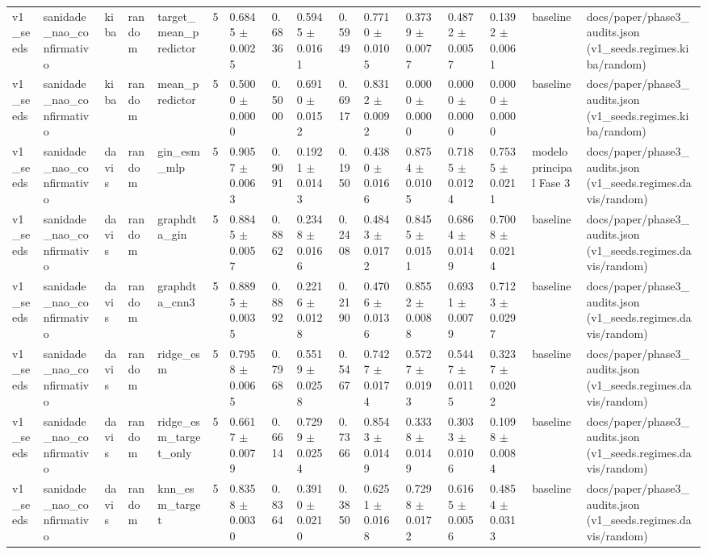 \begin{table}[htbp]
\begin{tabular}{llllllllllllllll}
v1\_seeds & sanidade\_nao\_confirmativo & kiba & random & target\_mean\_predictor & 5 & 0.6845 $\pm$ 0.0025 & 0.6836 & 0.5945 $\pm$ 0.0161 & 0.5949 & 0.7710 $\pm$ 0.0105 & 0.3739 $\pm$ 0.0077 & 0.4872 $\pm$ 0.0057 & 0.1392 $\pm$ 0.0061 & baseline & docs/paper/phase3\_audits.json (v1\_seeds.regimes.kiba/random) \\
v1\_seeds & sanidade\_nao\_confirmativo & kiba & random & mean\_predictor & 5 & 0.5000 $\pm$ 0.0000 & 0.5000 & 0.6910 $\pm$ 0.0152 & 0.6917 & 0.8312 $\pm$ 0.0092 & 0.0000 $\pm$ 0.0000 & 0.0000 $\pm$ 0.0000 & 0.0000 $\pm$ 0.0000 & baseline & docs/paper/phase3\_audits.json (v1\_seeds.regimes.kiba/random) \\
v1\_seeds & sanidade\_nao\_confirmativo & davis & random & gin\_esm\_mlp & 5 & 0.9057 $\pm$ 0.0063 & 0.9091 & 0.1921 $\pm$ 0.0143 & 0.1950 & 0.4380 $\pm$ 0.0166 & 0.8754 $\pm$ 0.0105 & 0.7185 $\pm$ 0.0124 & 0.7535 $\pm$ 0.0211 & modelo principal Fase 3 & docs/paper/phase3\_audits.json (v1\_seeds.regimes.davis/random) \\
v1\_seeds & sanidade\_nao\_confirmativo & davis & random & graphdta\_gin & 5 & 0.8845 $\pm$ 0.0057 & 0.8862 & 0.2348 $\pm$ 0.0166 & 0.2408 & 0.4843 $\pm$ 0.0172 & 0.8455 $\pm$ 0.0151 & 0.6864 $\pm$ 0.0149 & 0.7008 $\pm$ 0.0214 & baseline & docs/paper/phase3\_audits.json (v1\_seeds.regimes.davis/random) \\
v1\_seeds & sanidade\_nao\_confirmativo & davis & random & graphdta\_cnn3 & 5 & 0.8895 $\pm$ 0.0035 & 0.8892 & 0.2216 $\pm$ 0.0128 & 0.2190 & 0.4706 $\pm$ 0.0136 & 0.8552 $\pm$ 0.0088 & 0.6931 $\pm$ 0.0079 & 0.7123 $\pm$ 0.0297 & baseline & docs/paper/phase3\_audits.json (v1\_seeds.regimes.davis/random) \\
v1\_seeds & sanidade\_nao\_confirmativo & davis & random & ridge\_esm & 5 & 0.7958 $\pm$ 0.0065 & 0.7968 & 0.5519 $\pm$ 0.0258 & 0.5467 & 0.7427 $\pm$ 0.0174 & 0.5727 $\pm$ 0.0193 & 0.5447 $\pm$ 0.0115 & 0.3237 $\pm$ 0.0202 & baseline & docs/paper/phase3\_audits.json (v1\_seeds.regimes.davis/random) \\
v1\_seeds & sanidade\_nao\_confirmativo & davis & random & ridge\_esm\_target\_only & 5 & 0.6617 $\pm$ 0.0079 & 0.6614 & 0.7299 $\pm$ 0.0254 & 0.7366 & 0.8543 $\pm$ 0.0149 & 0.3338 $\pm$ 0.0149 & 0.3033 $\pm$ 0.0106 & 0.1098 $\pm$ 0.0084 & baseline & docs/paper/phase3\_audits.json (v1\_seeds.regimes.davis/random) \\
v1\_seeds & sanidade\_nao\_confirmativo & davis & random & knn\_esm\_target & 5 & 0.8358 $\pm$ 0.0030 & 0.8364 & 0.3910 $\pm$ 0.0210 & 0.3850 & 0.6251 $\pm$ 0.0168 & 0.7298 $\pm$ 0.0172 & 0.6165 $\pm$ 0.0056 & 0.4854 $\pm$ 0.0313 & baseline & docs/paper/phase3\_audits.json (v1\_seeds.regimes.davis/random) \\

\end{tabular}
\end{table}
